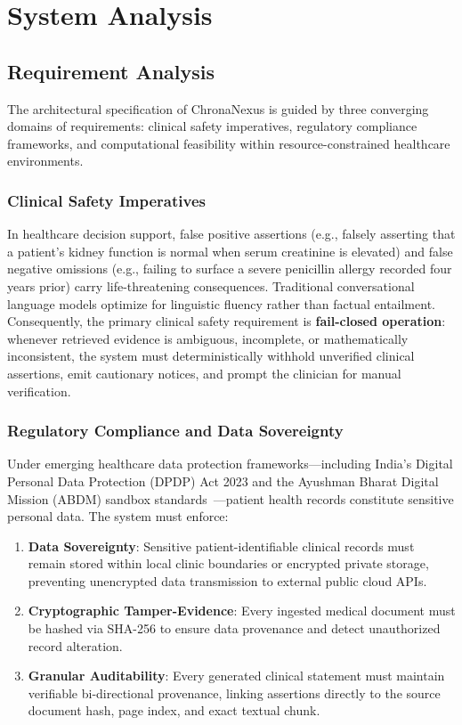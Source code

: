 \chapter{System Analysis}
\label{chap:system_analysis}

\section{Requirement Analysis}
\label{sec:sys_req_analysis}

The architectural specification of ChronaNexus is guided by three converging domains of requirements: clinical safety imperatives, regulatory compliance frameworks, and computational feasibility within resource-constrained healthcare environments.

\subsection{Clinical Safety Imperatives}
In healthcare decision support, false positive assertions (e.g., falsely asserting that a patient's kidney function is normal when serum creatinine is elevated) and false negative omissions (e.g., failing to surface a severe penicillin allergy recorded four years prior) carry life-threatening consequences. Traditional conversational language models optimize for linguistic fluency rather than factual entailment. Consequently, the primary clinical safety requirement is \textbf{fail-closed operation}: whenever retrieved evidence is ambiguous, incomplete, or mathematically inconsistent, the system must deterministically withhold unverified clinical assertions, emit cautionary notices, and prompt the clinician for manual verification.

\subsection{Regulatory Compliance and Data Sovereignty}
Under emerging healthcare data protection frameworks---including India's Digital Personal Data Protection (DPDP) Act 2023 and the Ayushman Bharat Digital Mission (ABDM) sandbox standards~\cite{nha2022abdm}---patient health records constitute sensitive personal data. The system must enforce:
\begin{enumerate}
    \item \textbf{Data Sovereignty}: Sensitive patient-identifiable clinical records must remain stored within local clinic boundaries or encrypted private storage, preventing unencrypted data transmission to external public cloud APIs.
    \item \textbf{Cryptographic Tamper-Evidence}: Every ingested medical document must be hashed via SHA-256 to ensure data provenance and detect unauthorized record alteration.
    \item \textbf{Granular Auditability}: Every generated clinical statement must maintain verifiable bi-directional provenance, linking assertions directly to the source document hash, page index, and exact textual chunk.
\end{enumerate}

